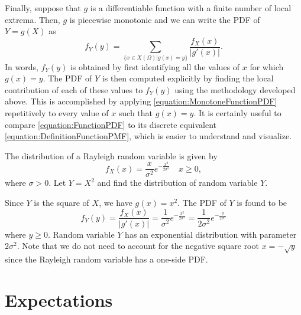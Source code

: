 Finally, suppose that $g$ is a differentiable function with a finite number of local extrema.
Then, $g$ is piecewise monotonic and we can write the PDF of $Y= g(X)$ as
\begin{equation} \label{equation:FunctionPDF}
f_Y (y) = \sum_{\{ x \in X(\Omega) | g(x) = y\}}
\frac{f_X (x)}{\left| g'(x) \right|} .
\end{equation}
In words, $f_Y (y)$ is obtained by first identifying all the values of $x$ for which $g(x) = y$.
The PDF of $Y$ is then computed explicitly by finding the local contribution of each of these values to $f_Y(y)$ using the methodology developed above.
This is accomplished by applying \eqref{equation:MonotoneFunctionPDF} repetitively to every value of $x$ such that $g(x) = y$.
It is certainly useful to compare \eqref{equation:FunctionPDF} to its discrete equivalent \eqref{equation:DefinitionFunctionPMF}, which is easier to understand and visualize.

\begin{example}
The distribution of a Rayleigh random variable is given by
\begin{equation*}
f_X (x) = \frac{x}{\sigma^2} e^{- \frac{x^2}{2 \sigma^2} } \quad x \geq 0,
\end{equation*}
where $\sigma > 0$.
Let $Y = X^2$ and find the distribution of random variable $Y$.

Since $Y$ is the square of $X$, we have $g(x) = x^2$.
The PDF of $Y$ is found to be
\begin{equation*}
f_Y(y) = \frac{f_X (x)}{|g'(x)|}
= \frac{1}{\sigma^2} e^{- \frac{x^2}{2 \sigma^2} }
= \frac{1}{2 \sigma^2} e^{- \frac{y}{2 \sigma^2} }
\end{equation*}
where $y \geq 0$.
Random variable $Y$ has an exponential distribution with parameter $2 \sigma^2$.
Note that we do not need to account for the negative square root $x = - \sqrt{y}$ since the Rayleigh random variable has a one-side PDF.
\end{example}


\section{Expectations}

